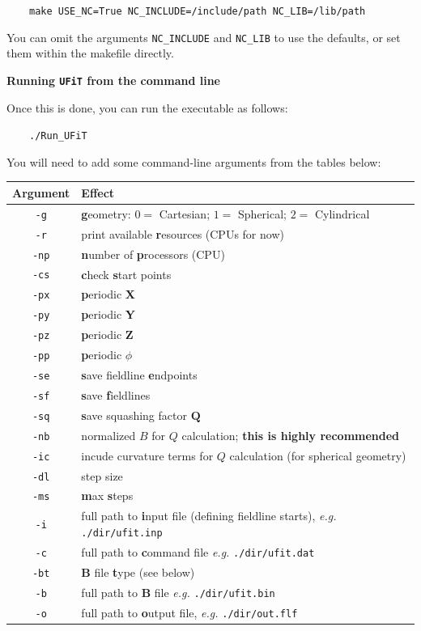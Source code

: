 \documentclass[12pt,twoside]{article}
\begin{document}
$\quad\quad$\texttt{make USE\_NC=True NC\_INCLUDE=/include/path NC\_LIB=/lib/path}

You can omit the arguments \texttt{NC\_INCLUDE} and \texttt{NC\_LIB} to use the defaults, or set them within the makefile directly.


\vspace{2mm}
{\Large \textbf{Running \texttt{UFiT} from the command line}}

Once this is done, you can run the executable as follows: 

$\quad\quad$\texttt{./Run\_UFiT}

You will need to add some command-line arguments from the tables below:

\vspace{2mm}

\begin{tabular}{|c|l|}		
		\hline
		\textbf{Argument} & \textbf{Effect} \\\hline\hline
		\texttt{-g} & \textbf{g}eometry: $0 =$ Cartesian; $1 =$ Spherical; $2 =$ Cylindrical  \\\hline
		\texttt{-r} & print available \textbf{r}esources (CPUs for now) \\\hline
		\texttt{-np} &  \textbf{n}umber of \textbf{p}rocessors (CPU) \\\hline
		\texttt{-cs} & \textbf{c}heck \textbf{s}tart points \\\hline
		\texttt{-px} & \textbf{p}eriodic \textbf{X} \\\hline
		\texttt{-py} & \textbf{p}eriodic \textbf{Y}  \\\hline
		\texttt{-pz} & \textbf{p}eriodic \textbf{Z}  \\\hline
		\texttt{-pp} & \textbf{p}eriodic $\phi$  \\\hline
		\texttt{-se} & \textbf{s}ave fieldline \textbf{e}ndpoints \\\hline
		\texttt{-sf} & \textbf{s}ave \textbf{f}ieldlines \\\hline
		\texttt{-sq} & \textbf{s}ave squashing factor $\mathbf{Q}$  \\\hline
		\texttt{-nb} & normalized $B$ for $Q$ calculation; \textbf{this is highly recommended} \\\hline
		\texttt{-ic} & incude curvature terms for $Q$ calculation (for spherical geometry) \\\hline
		\texttt{-dl} & step size \\\hline
		\texttt{-ms} & \textbf{m}ax \textbf{s}teps  \\\hline
		\texttt{-i} & full path to \textbf{i}nput file (defining fieldline starts), \textit{e.g.} \texttt{./dir/ufit.inp} \\\hline
		\texttt{-c} & full path to \textbf{c}ommand file \textit{e.g.} \texttt{./dir/ufit.dat} \\\hline
		\texttt{-bt} & $\mathbf{B}$ file \textbf{t}ype (see below) \\\hline
		\texttt{-b} & full path to $\mathbf{B}$ file \textit{e.g.} \texttt{./dir/ufit.bin} \\\hline
		\texttt{-o} & full path to \textbf{o}utput file, \textit{e.g.} \texttt{./dir/out.flf} \\\hline


\end{tabular}
\end{document}
